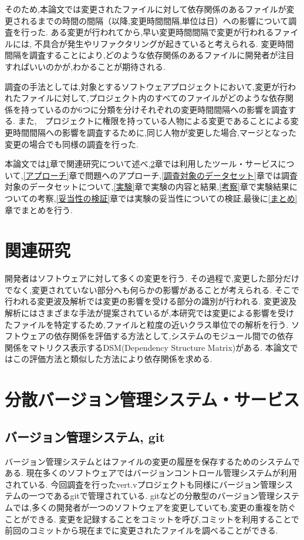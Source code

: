 \documentclass{fose2016}           %
\begin{document}
そのため,本論文では変更されたファイルに対して依存関係のあるファイルが変更されるまでの時間の間隔（以降,変更時間間隔,単位は日）への影響について調査を行った.
ある変更が行われてから,早い変更時間間隔で変更が行われるファイルには, 不具合が発生やリファクタリングが起きていると考えられる.
変更時間間隔を調査することにより,どのような依存関係のあるファイルに開発者が注目すればいいのかが,わかることが期待される.

調査の手法としては,対象とするソフトウェアプロジェクトにおいて,変更が行われたファイルに対して,プロジェクト内のすべてのファイルがどのような依存関係を持っているのか6つに分類を分けそれぞれの変更時間間隔への影響を調査する.
また,　プロジェクトに権限を持っている人物による変更であることによる変更時間間隔への影響を調査するために,同じ人物が変更した場合,マージとなった変更の場合でも同様の調査を行った.

本論文では\ref{関連研究}章で関連研究について述べ,\ref{ツール・サービス}章では利用したツール・サービスについて,\ref{アプローチ}章で問題へのアプローチ,\ref{調査対象のデータセット}章では調査対象のデータセットについて,\ref{実験}章で実験の内容と結果,\ref{考察}章で実験結果についての考察,\ref{妥当性の検証}章では実験の妥当性についての検証,最後に\ref{まとめ}章でまとめを行う.


\section{関連研究}\label{関連研究}
開発者はソフトウェアに対して多くの変更を行う.
その過程で,変更した部分だけでなく,変更されていない部分へも何らかの影響があることが考えられる.
そこで行われる変更波及解析では変更の影響を受ける部分の識別が行われる.
変更波及解析にはさまざまな手法が提案されているが\cite{Ryder,Kondo},本研究では変更による影響を受けたファイルを特定するため,ファイルと粒度の近いクラス単位での解析\cite{Ryder}を行う.
ソフトウェアの依存関係を評価する方法として,システムのモジュール間での依存関係をマトリクス表示するDSM(Dependency Structure Matrix)がある\cite{Nord}.
本論文ではこの評価方法と類似した方法により依存関係を求める.

\section{分散バージョン管理システム・サービス}\label{ツール・サービス}
\subsection{バージョン管理システム, git}
バージョン管理システムとはファイルの変更の履歴を保存するためのシステムである.
現在多くのソフトウェアではバージョンコントロール管理システムが利用されている.
今回調査を行ったvert.vプロジェクトも同様にバージョン管理システムの一つであるgitで管理されている.
gitなどの分散型のバージョン管理システムでは,多くの開発者が一つのソフトウェアを変更していても,変更の重複を防ぐことができる.
変更を記録することをコミットを呼び,コミットを利用することで前回のコミットから現在までに変更されたファイルを調べることができる.
\end{document}
